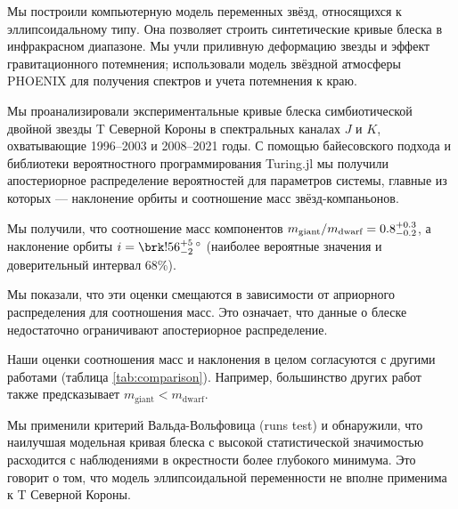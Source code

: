 


Мы построили компьютерную модель переменных звёзд, относящихся к эллипсоидальному типу. Она позволяет строить синтетические кривые блеска в инфракрасном диапазоне. Мы учли приливную деформацию звезды и эффект гравитационного потемнения; использовали модель звёздной атмосферы PHOENIX для получения спектров и учета потемнения к краю.

Мы проанализировали экспериментальные кривые блеска симбиотической двойной звезды T Северной Короны в спектральных каналах $J$ и $K$, охватывающие 1996--2003 и 2008--2021 годы. С помощью байесовского подхода и библиотеки вероятностного программирования Turing.jl мы получили апостериорное распределение вероятностей для параметров системы, главные из которых ---  наклонение орбиты и соотношение масс звёзд-компаньонов.

Мы получили, что соотношение масс компонентов $m_\text{giant} / m_\text{dwarf} = 0.8^{+0.3}_{-0.2}$, а наклонение орбиты $i = \resulti$ (наиболее вероятные значения и доверительный интервал 68\%).

Мы показали, что эти оценки смещаются в зависимости от априорного распределения для соотношения масс. Это означает, что данные о блеске недостаточно ограничивают апостериорное распределение.

Наши оценки соотношения масс и наклонения в целом согласуются с другими работами (таблица \ref{tab:comparison}). Например, большинство других работ также предсказывает $m_\text{giant} < m_\text{dwarf}$.

Мы применили критерий Вальда-Вольфовица (runs test) и обнаружили, что наилучшая модельная кривая блеска с высокой статистической значимостью расходится с наблюдениями в окрестности более глубокого минимума. Это говорит о том, что модель эллипсоидальной переменности не вполне применима к T Северной Короны.


\showbib


